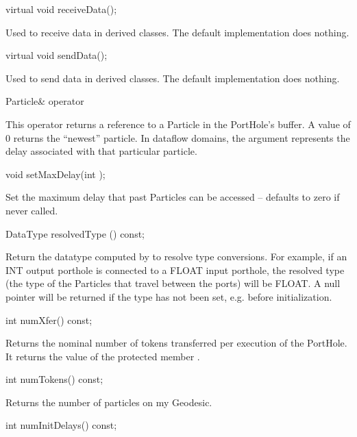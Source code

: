\begin{example}
virtual void receiveData();
\end{example}

Used to receive data in derived classes.  The default implementation
does nothing.

\begin{example}
virtual void sendData();
\end{example}

Used to send data in derived classes.  The default implementation
does nothing.

\begin{example}
Particle& operator %
\end{example}

This operator returns a reference to a Particle in the PortHole's
buffer.  A  value of 0 returns the ``newest'' particle.
In dataflow domains, the argument represents the delay associated
with that particular particle.

\begin{example}
void setMaxDelay(int );
\end{example}

Set the maximum delay that past Particles can be accessed -- defaults to
zero if never called.

\begin{example}
DataType resolvedType () const;
\end{example}

Return the datatype computed by  to resolve
type conversions.  For example, if an INT output porthole is connected
to a FLOAT input porthole, the resolved type (the type of the Particles
that travel between the ports) will be FLOAT.  A null pointer will be
returned if the type has not been set, e.g. before initialization.

\begin{example}
int numXfer() const;
\end{example}

Returns the nominal number of tokens transferred per execution of the
PortHole.  It returns the value of the protected member .

\begin{example}
int numTokens() const;
\end{example}

Returns the number of particles on my Geodesic.

\begin{example}
int numInitDelays() const;
\end{example}

